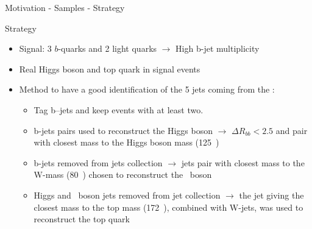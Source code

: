 \begin{frame}{Motivation - Samples - Strategy}
\vspace{-.2cm}
\begin{block}{Strategy}
\begin{itemize}\tiny
\item Signal: 3 $b$-quarks and 2 light quarks $\to$ High b-jet multiplicity
\item Real Higgs boson and top quark in signal events
\item Method to have a good identification of the 5 jets coming from the \Tp:
\begin{itemize}\tiny
\item Tag b--jets and keep events with at least two.
\item b-jets pairs used to reconstruct the Higgs boson $\to$ ${\Delta R_{bb} <2.5}$ and pair with closest mass to the Higgs boson mass (125~\GeVcc)
\item b-jets removed from jets collection $\to$ jets pair with closest mass to the W-mass (80~\GeVcc) chosen to reconstruct the \W~boson 
\item Higgs and \W~boson jets removed from jet collection $\to$ the jet giving the closest mass to the top mass (172~\GeVcc), combined with W-jets, was used to reconstruct the top quark
\end{itemize}
\end{itemize}

\end{block}

\end{frame}

